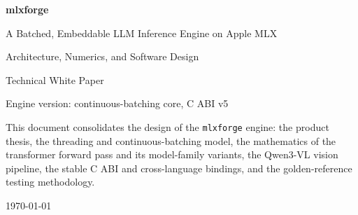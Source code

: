 \documentclass[11pt,a4paper]{report}
\newcommand{\code}[1]{\texttt{#1}}
\begin{document}
\begin{titlepage}
  \centering
  \vspace*{2cm}
  {\Huge\bfseries mlxforge\par}
  \vspace{0.6cm}
  {\Large A Batched, Embeddable LLM Inference Engine on Apple MLX\par}
  \vspace{0.4cm}
  {\large Architecture, Numerics, and Software Design\par}
  \vspace{2cm}
  {\large Technical White Paper\par}
  \vspace{0.3cm}
  {\normalsize Engine version: continuous-batching core, C ABI v5\par}
  \vfill
  {\small This document consolidates the design of the \code{mlxforge} engine: the
  product thesis, the threading and continuous-batching model, the mathematics of
  the transformer forward pass and its model-family variants, the Qwen3-VL vision
  pipeline, the stable C ABI and cross-language bindings, and the
  golden-reference testing methodology.\par}
  \vspace{1cm}
  {\small\today\par}
\end{titlepage}

\begin{abstract}
\noindent
\code{mlxforge} is a from-scratch C++17 inference engine built directly on the
Apple MLX C++ array library (not \code{mlx-lm}), targeting Apple Silicon through
the Metal backend. It serves LLaMA-family decoder models (Llama-3.2, Qwen3
dense/MoE, Qwen3.5 hybrid) and the Qwen3-VL vision-language model, with
\emph{continuous batching}: many concurrent requests share one resident model and
one GPU worker, dynamically admitted and evicted from an active batch.

The engine occupies a specific gap in the Apple MLX ecosystem. Single-stream
libraries (\code{node-mlx}, Apple's \code{MLXLLM}) cannot batch; batched servers
(\code{vllm-mlx}, \code{omlx}) are Python processes reachable only over HTTP.
\code{mlxforge} is simultaneously \emph{in-process}, \emph{MLX-native}, and
\emph{batched}, exposed through a stable C ABI so it can be embedded from Node,
Swift, and Rust as a shared library --- the library, not the bundled HTTP server
or CLI, is the product.

The defining engineering constraint is that the failure mode of an inference
engine is \emph{silent numerical garbage, not a crash}. Every numerically
sensitive stage --- embedding, RoPE, attention masking, the per-layer forward,
sampling, and the full vision pipeline --- is gated against \code{.npy} golden
fixtures dumped from the \code{mlx-lm}/\code{mlx-vlm} reference running the same
weights, with greedy decoding required to match token-for-token. This paper
documents the architecture and the mathematics in enough detail to reproduce or
audit the implementation.
\end{abstract}
\end{document}
